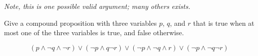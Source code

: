 \begin{questions}
\begin{solution}
    \emph{Note, this is one possible valid argument; many others exists.}

\end{solution}



\bonusquestion[2] Give a compound proposition with three variables $p$, $q$, and $r$ that is 
true when at most one of the three variables is true, and false otherwise.
    \begin{solution}
    \[ (p \wedge \neg q \wedge \neg r) \vee (\neg p \wedge q \neg r) 
        \vee (\neg p \wedge \neg q \wedge r) \vee (\neg p \wedge \neg q \neg r)\]
    \end{solution}





\end{questions}

